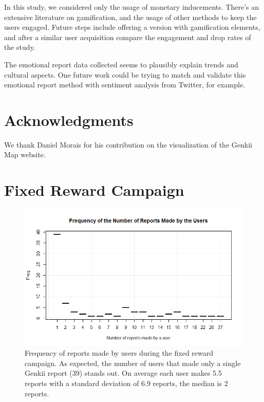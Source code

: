\documentclass[letterpaper]{article}
\begin{document}
In this study, we considered only the usage of monetary inducements. There's an extensive literature on gamification, and the usage of other methods to keep the users engaged. Future steps include offering a version with gamification elements, and after a similar user acquisition compare the engagement and drop rates of the study.

The emotional report data collected seems to plausibly explain trends and cultural aspects. One future work could be trying to match and validate this emotional report method with sentiment analysis from Twitter, for example. 



\section{ Acknowledgments}

We thank Daniel Morais for his contribution on the visualization of the Genkii Map website.

\appendix

\section{Fixed Reward Campaign}

\begin{figure}[htb]
	\begin{center}
		\includegraphics[width=1\linewidth]{images/FrequencyNumberReports_F}
		\caption{Frequency of reports made by users during the fixed reward campaign. As expected, the number of users that made only a single Genkii report (39) stands out. On average each user makes 5.5 reports with a standard deviation of 6.9 reports, the median is 2 reports.\label{fig:freqreports1}}
	\end{center}
\end{figure}
\end{document}
